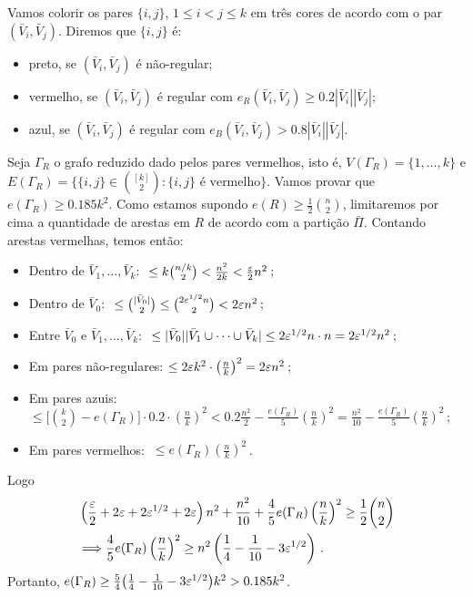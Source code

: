 Vamos colorir os pares $\{i,j\}$, $1\leq i<j\leq k$ em três cores de acordo com o par $(\bar{V}_i, \bar{V}_j)$. Diremos que $\{i, j\}$ é:
\begin{itemize}
	\item preto, se $(\bar{V}_i, \bar{V}_j)$ é não-regular;
	\item vermelho, se $(\bar{V}_i, \bar{V}_j)$ é regular com $e_R(\bar{V}_i, \bar{V}_j)\geq 0.2|\bar{V}_i||\bar{V}_j|$;
	\item azul, se $(\bar{V}_i, \bar{V}_j)$ é regular com $e_B(\bar{V}_i, \bar{V}_j)>0.8|\bar{V}_i||\bar{V}_j|$.
\end{itemize}

Seja $\Gamma_R$ o grafo reduzido dado pelos pares vermelhos, isto é, $V(\Gamma_R) = \{1,\dots, k\}$ e $E(\Gamma_R) = \{\{i,j\}\in \binom{[k]}{2}: \{i,j\} \text{ é vermelho}\}$. Vamos provar que $e(\Gamma_R)\geq0.185k^2$.
Como estamos supondo $e(R)\geq \frac{1}{2}\binom{n}{2}$, limitaremos por cima a quantidade de arestas em $R$ de acordo com a partição $\bar{\Pi}$. Contando arestas vermelhas, temos então:
\begin{itemize}
	\item[] Dentro de $\bar{V}_1, \dots, \bar{V}_k$: $~\leq k \binom{n/k}{2} < \frac{n^2}{2k} < \frac{\varepsilon}{2}n^2$\,;
	\item[] Dentro de $\bar{V}_0$: $~\leq \binom{|\bar{V}_0|}{2}\leq \binom{2\varepsilon^{1/2}n}{2} < 2\varepsilon n^2$\,;
	\item[] Entre $\bar{V}_0$ e $\bar{V}_1,\dots, \bar{V}_k$: $~\leq |\bar{V}_0||\bar{V}_1\cup\dots\cup \bar{V}_k| \leq 2\varepsilon^{1/2}n\cdot n = 2\varepsilon^{1/2}n^2$\,;
	\item[] Em pares não-regulares: $\leq 2\varepsilon k^2\cdot \left(\frac{n}{k}\right)^2 = 2\varepsilon n^2$\,;
	\item[] Em pares azuis: $\leq \big[\binom{k}{2} - e(\Gamma_R)\big]\cdot 0.2 \cdot \left(\frac{n}{k}\right)^2 < 0.2\frac{n^2}{2} - \frac{e(\Gamma_R)}{5}\left(\frac{n}{k}\right)^2 = \frac{n^2}{10} - \frac{e(\Gamma_R)}{5}\left(\frac{n}{k}\right)^2$\,;
	\item[] Em pares vermelhos: $~\leq e(\Gamma_R)\left(\frac{n}{k}\right)^2$\,.
\end{itemize}
Logo 
\begin{align*}
	&\left(\frac{\varepsilon}{2} + 2\varepsilon + 2\varepsilon^{1/2} + 2\varepsilon\right)n^2 + \frac{n^2}{10} + \frac{4}{5}e(\Gamma_R)\left(\frac{n}{k}\right)^2\geq \frac{1}{2}\binom{n}{2}\\
	&\Longrightarrow  \frac{4}{5}e(\Gamma_R)\left(\frac{n}{k}\right)^2\geq n^2\left(\frac{1}{4} - \frac{1}{10} - 3\varepsilon^{1/2}\right)\,.
\end{align*}
Portanto, $e(\Gamma_R)\geq \frac{5}{4}\big(\frac{1}{4} - \frac{1}{10} - 3\varepsilon^{1/2}\big)k^2 > 0.185k^2$.

